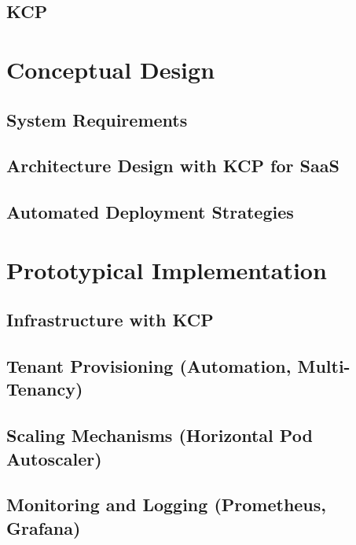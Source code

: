 \documentclass[11pt, a4paper, oneside, listof=totoc]{scrartcl}
\begin{document}
        \subsection{KCP}\label{subsec:relatedKCP}

    \section{Conceptual Design}\label{sec:concept}

        \subsection{System Requirements}\label{subsec:requirements}

        \subsection{Architecture Design with KCP for SaaS}\label{subsec:architectureDesign}

        \subsection{Automated Deployment Strategies}\label{subsec:deploymentStrategies}

    \section{Prototypical Implementation}\label{sec:prototype}

        \subsection{Infrastructure with KCP}\label{subsec:infrastructure}

        \subsection[Tenant Provisioning]{Tenant Provisioning (Automation, Multi-Tenancy)}\label{subsec:tenantProvisioning}

        \subsection[Scaling Mechanisms]{Scaling Mechanisms (Horizontal Pod Autoscaler)}\label{subsec:scaling}

        \subsection[Monitoring and Logging]{Monitoring and Logging (Prometheus, Grafana)}\label{subsec:monitoring}
\end{document}

